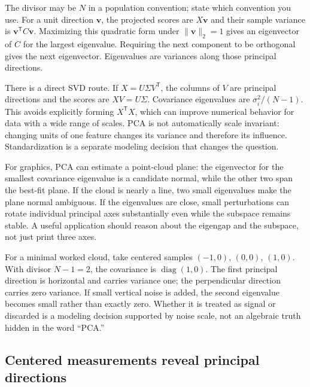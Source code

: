 The divisor may be \(N\) in a population convention; state which convention you use. For a unit direction \(\mathbf v\), the projected scores are \(X\mathbf v\) and their sample variance is \(\mathbf v^\mathsf T C\mathbf v\). Maximizing this quadratic form under \(\|\mathbf v\|_2=1\) gives an eigenvector of \(C\) for the largest eigenvalue. Requiring the next component to be orthogonal gives the next eigenvector. Eigenvalues are variances along those principal directions.

There is a direct SVD route. If \(X=U\Sigma V^\mathsf T\), the columns of \(V\) are principal directions and the scores are \(XV=U\Sigma\). Covariance eigenvalues are \(\sigma_i^2/(N-1)\). This avoids explicitly forming \(X^\mathsf T X\), which can improve numerical behavior for data with a wide range of scales. PCA is not automatically scale invariant: changing units of one feature changes its variance and therefore its influence. Standardization is a separate modeling decision that changes the question.

For graphics, PCA can estimate a point-cloud plane: the eigenvector for the smallest covariance eigenvalue is a candidate normal, while the other two span the best-fit plane. If the cloud is nearly a line, two small eigenvalues make the plane normal ambiguous. If the eigenvalues are close, small perturbations can rotate individual principal axes substantially even while the subspace remains stable. A useful application should reason about the eigengap and the subspace, not just print three axes.

For a minimal worked cloud, take centered samples \((-1,0)\), \((0,0)\), \((1,0)\). With divisor \(N-1=2\), the covariance is \(\operatorname{diag}(1,0)\). The first principal direction is horizontal and carries variance one; the perpendicular direction carries zero variance. If small vertical noise is added, the second eigenvalue becomes small rather than exactly zero. Whether it is treated as signal or discarded is a modeling decision supported by noise scale, not an algebraic truth hidden in the word ``PCA.''

\subsection{Centered measurements reveal principal directions}\label{02-foundations-ii-ch024-centered-measurements-reveal-principal-directions}

\hypertarget{02-foundations-ii-ch024-centered-measurements-reveal-principal-directions}{}

